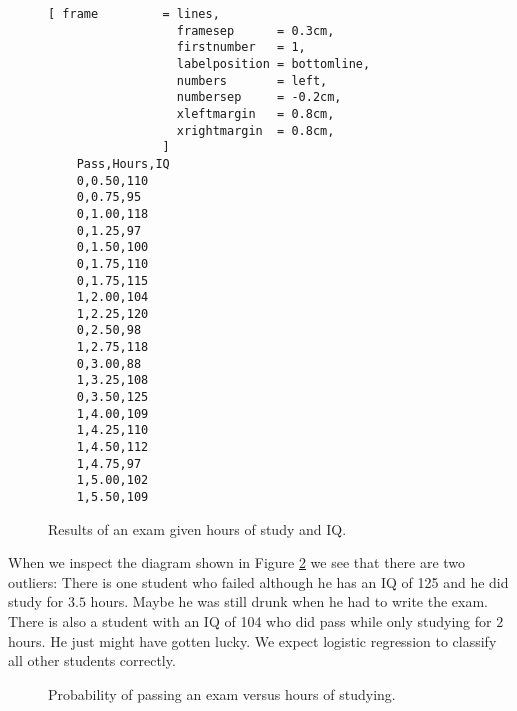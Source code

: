 \begin{figure}[!ht]
\centering
\begin{Verbatim}[ frame         = lines, 
                  framesep      = 0.3cm, 
                  firstnumber   = 1,
                  labelposition = bottomline,
                  numbers       = left,
                  numbersep     = -0.2cm,
                  xleftmargin   = 0.8cm,
                  xrightmargin  = 0.8cm,
                ]
    Pass,Hours,IQ
    0,0.50,110
    0,0.75,95
    0,1.00,118
    0,1.25,97
    0,1.50,100
    0,1.75,110
    0,1.75,115
    1,2.00,104
    1,2.25,120
    0,2.50,98
    1,2.75,118
    0,3.00,88
    1,3.25,108
    0,3.50,125
    1,4.00,109
    1,4.25,110
    1,4.50,112
    1,4.75,97
    1,5.00,102
    1,5.50,109
\end{Verbatim}
\vspace*{-0.3cm}
\caption{Results of an exam given hours of study and IQ.}
\label{fig:exam-iq.csv}
\end{figure}

When we inspect the diagram shown in Figure \ref{fig:exam-iq.pdf} we see that there are two outliers: There is
one student who failed although he has an IQ of 125 and he did study for $3.5$ hours.  Maybe he was still drunk
when he had to write the exam.  There is also a student with an IQ of 104 who did pass while only studying for
$2$ hours.  He just might have gotten lucky. We expect logistic regression to classify all other students
correctly.

\begin{figure}[!th]
\caption{Probability of passing an exam versus hours of studying.}
\label{fig:exam-iq.pdf}
\end{figure}



